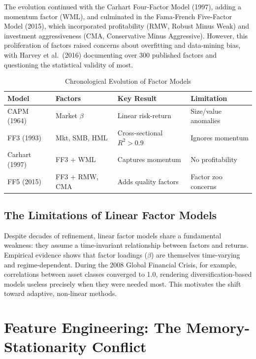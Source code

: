 \documentclass[conference]{IEEEtran}
\begin{document}
The evolution continued with the Carhart Four-Factor Model (1997), adding a momentum factor (WML), and culminated in the Fama-French Five-Factor Model (2015), which incorporated profitability (RMW, Robust Minus Weak) and investment aggressiveness (CMA, Conservative Minus Aggressive). However, this proliferation of factors raised concerns about overfitting and data-mining bias, with Harvey et al.\ (2016) documenting over 300 published factors and questioning the statistical validity of most.

\begin{table}[ht]
\centering
\caption{Chronological Evolution of Factor Models}
\label{tab:factors}
\begin{tabular}{@{}p{1.5cm}p{2.2cm}p{1.8cm}p{1.8cm}@{}}
\toprule
\textbf{Model} & \textbf{Factors} & \textbf{Key Result} & \textbf{Limitation} \\
\midrule
CAPM (1964) & Market $\beta$ & Linear risk-return & Size/value anomalies \\
\addlinespace
FF3 (1993) & Mkt, SMB, HML & Cross-sectional $R^2 > 0.9$ & Ignores momentum \\
\addlinespace
Carhart (1997) & FF3 + WML & Captures momentum & No profitability \\
\addlinespace
FF5 (2015) & FF3 + RMW, CMA & Adds quality factors & Factor zoo concerns \\
\bottomrule
\end{tabular}
\end{table}

\subsection{The Limitations of Linear Factor Models}
Despite decades of refinement, linear factor models share a fundamental weakness: they assume a time-invariant relationship between factors and returns. Empirical evidence shows that factor loadings ($\beta$) are themselves time-varying and regime-dependent. During the 2008 Global Financial Crisis, for example, correlations between asset classes converged to 1.0, rendering diversification-based models useless precisely when they were needed most. This motivates the shift toward adaptive, non-linear methods.

\section{Feature Engineering: The Memory-Stationarity Conflict}
\end{document}
